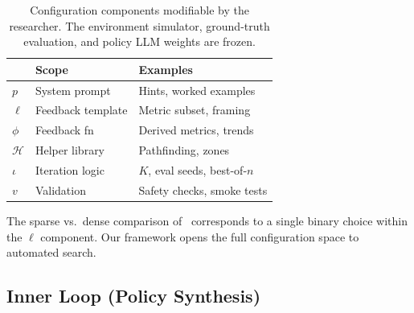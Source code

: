 \documentclass[sigconf,authordraft]{acmart}
\begin{document}
\begin{table}[t]
\caption{Configuration components modifiable by the researcher. The environment simulator, ground-truth evaluation, and policy LLM weights are frozen.}
\label{tab:config}
\centering
\small
\begin{tabular}{@{}lll@{}}
\toprule
 & Scope & Examples \\
\midrule
$p$ & System prompt & Hints, worked examples \\
$\ell$ & Feedback template & Metric subset, framing \\
$\phi$ & Feedback fn & Derived metrics, trends \\
$\mathcal{H}$ & Helper library & Pathfinding, zones \\
$\iota$ & Iteration logic & $K$, eval seeds, best-of-$n$ \\
$v$ & Validation & Safety checks, smoke tests \\
\bottomrule
\end{tabular}
\end{table}

The sparse vs.\ dense comparison of~\cite{gallego2026} corresponds to a single binary choice within the $\ell$ component. Our framework opens the full configuration space to automated search.

\subsection{Inner Loop (Policy Synthesis)}
\end{document}
